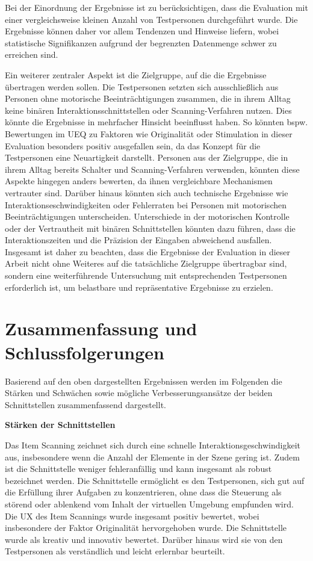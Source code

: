 Bei der Einordnung der Ergebnisse ist zu berücksichtigen, dass die Evaluation mit einer vergleichsweise kleinen Anzahl von Testpersonen durchgeführt wurde. Die Ergebnisse können daher vor allem Tendenzen und Hinweise liefern, wobei statistische Signifikanzen aufgrund der begrenzten Datenmenge schwer zu erreichen sind.

Ein weiterer zentraler Aspekt ist die Zielgruppe, auf die die Ergebnisse übertragen werden sollen. Die Testpersonen setzten sich ausschließlich aus Personen ohne motorische Beeinträchtigungen zusammen, die in ihrem Alltag keine binären Interaktionsschnittstellen oder Scanning-Verfahren nutzen. Dies könnte die Ergebnisse in mehrfacher Hinsicht beeinflusst haben. So könnten bspw. Bewertungen im UEQ zu Faktoren wie Originalität oder Stimulation in dieser Evaluation besonders positiv ausgefallen sein, da das Konzept für die Testpersonen eine Neuartigkeit darstellt. Personen aus der Zielgruppe, die in ihrem Alltag bereits Schalter und Scanning-Verfahren verwenden, könnten diese Aspekte hingegen anders bewerten, da ihnen vergleichbare Mechanismen vertrauter sind.
Darüber hinaus könnten sich auch technische Ergebnisse wie Interaktionseschwindigkeiten oder Fehlerraten bei Personen mit motorischen Beeinträchtigungen unterscheiden. Unterschiede in der motorischen Kontrolle oder der Vertrautheit mit binären Schnittstellen könnten dazu führen, dass die Interaktionszeiten und die Präzision der Eingaben abweichend ausfallen. Insgesamt ist daher zu beachten, dass die Ergebnisse der Evaluation in dieser Arbeit nicht ohne Weiteres auf die tatsächliche Zielgruppe übertragbar sind, sondern eine weiterführende Untersuchung mit entsprechenden Testpersonen erforderlich ist, um belastbare und repräsentative Ergebnisse zu erzielen.

\section{Zusammenfassung und Schlussfolgerungen}

Basierend auf den oben dargestellten Ergebnissen werden im Folgenden die Stärken und Schwächen sowie mögliche Verbesserungsansätze der beiden Schnittstellen zusammenfassend dargestellt.

\textbf{Stärken der Schnittstellen}

Das Item Scanning zeichnet sich durch eine schnelle Interaktionsgeschwindigkeit aus, insbesondere wenn die Anzahl der Elemente in der Szene gering ist. Zudem ist die Schnittstelle weniger fehleranfällig und kann insgesamt als robust bezeichnet werden. Die Schnittstelle ermöglicht es den Testpersonen, sich gut auf die Erfüllung ihrer Aufgaben zu konzentrieren, ohne dass die Steuerung als störend oder ablenkend vom Inhalt der virtuellen Umgebung empfunden wird. Die UX des Item Scannings wurde insgesamt positiv bewertet, wobei insbesondere der Faktor Originalität hervorgehoben wurde. Die Schnittstelle wurde als kreativ und innovativ bewertet. Darüber hinaus wird sie von den Testpersonen als verständlich und leicht erlernbar beurteilt. 

